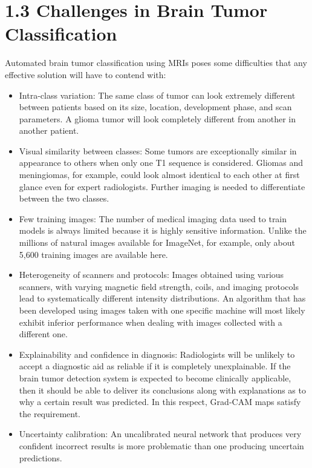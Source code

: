 \documentclass[12pt,a4paper,oneside]{report}
\begin{document}
\section{1.3 Challenges in Brain Tumor Classification}
Automated brain tumor classification using MRIs poses some difficulties that any effective solution will have to contend with:
\begin{itemize}[leftmargin=*]
  \item Intra-class variation: The same class of tumor can look extremely different between patients based on its size, location, development phase, and scan parameters. A glioma tumor will look completely different from another in another patient.
  \item Visual similarity between classes: Some tumors are exceptionally similar in appearance to others when only one T1 sequence is considered. Gliomas and meningiomas, for example, could look almost identical to each other at first glance even for expert radiologists. Further imaging is needed to differentiate between the two classes.
  \item Few training images: The number of medical imaging data used to train models is always limited because it is highly sensitive information. Unlike the millions of natural images available for ImageNet, for example, only about 5,600 training images are available here.
  \item Heterogeneity of scanners and protocols: Images obtained using various scanners, with varying magnetic field strength, coils, and imaging protocols lead to systematically different intensity distributions. An algorithm that has been developed using images taken with one specific machine will most likely exhibit inferior performance when dealing with images collected with a different one.
  \item Explainability and confidence in diagnosis: Radiologists will be unlikely to accept a diagnostic aid as reliable if it is completely unexplainable. If the brain tumor detection system is expected to become clinically applicable, then it should be able to deliver its conclusions along with explanations as to why a certain result was predicted. In this respect, Grad-CAM maps satisfy the requirement.
  \item Uncertainty calibration: An uncalibrated neural network that produces very confident incorrect results is more problematic than one producing uncertain predictions.
\end{itemize}
\end{document}
